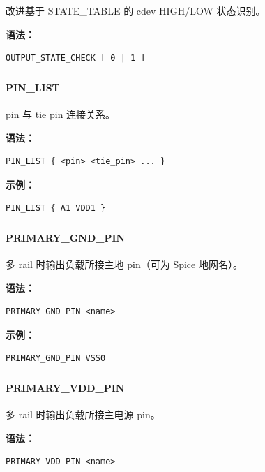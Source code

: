 改进基于 STATE\_TABLE 的 cdev HIGH/LOW 状态识别。

\textbf{语法：}
\begin{lstlisting}
OUTPUT_STATE_CHECK [ 0 | 1 ]
\end{lstlisting}

\subsubsection{}
\paragraph*{PIN_LIST}

pin 与 tie pin 连接关系。

\textbf{语法：}
\begin{lstlisting}
PIN_LIST { <pin> <tie_pin> ... }
\end{lstlisting}

\textbf{示例：}
\begin{lstlisting}
PIN_LIST { A1 VDD1 }
\end{lstlisting}

\subsubsection{}
\paragraph*{PRIMARY_GND_PIN}

多 rail 时输出负载所接主地 pin（可为 Spice 地网名）。

\textbf{语法：}
\begin{lstlisting}
PRIMARY_GND_PIN <name>
\end{lstlisting}

\textbf{示例：}
\begin{lstlisting}
PRIMARY_GND_PIN VSS0
\end{lstlisting}

\subsubsection{}
\paragraph*{PRIMARY_VDD_PIN}

多 rail 时输出负载所接主电源 pin。

\textbf{语法：}
\begin{lstlisting}
PRIMARY_VDD_PIN <name>
\end{lstlisting}

